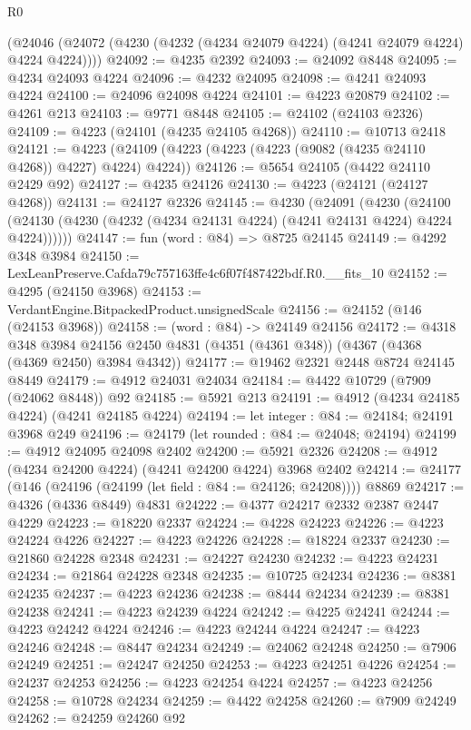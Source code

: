 \begin{lexlean}{R0}
\begin{coremodule}
    (@24046 (@24072 (@4230 (@4232 (@4234 @24079 @4224) (@4241 @24079 @4224) @4224 @4224))))
@24092 := @4235 @2392
@24093 := @24092 @8448
@24095 := @4234 @24093 @4224
@24096 := @4232 @24095
@24098 := @4241 @24093 @4224
@24100 := @24096 @24098 @4224
@24101 := @4223 @20879
@24102 := @4261 @213
@24103 := @9771 @8448
@24105 := @24102 (@24103 @2326)
@24109 := @4223 (@24101 (@4235 @24105 @4268))
@24110 := @10713 @2418
@24121 := @4223 (@24109 (@4223 (@4223 (@4223 (@9082 (@4235 @24110 @4268)) @4227) @4224) @4224))
@24126 := @5654 @24105 (@4422 @24110 @2429 @92)
@24127 := @4235 @24126
@24130 := @4223 (@24121 (@24127 @4268))
@24131 := @24127 @2326
@24145 := @4230
    (@24091
      (@4230
        (@24100 (@24130 (@4230 (@4232 (@4234 @24131 @4224) (@4241 @24131 @4224) @4224 @4224))))))
@24147 := fun (word : @84) => @8725 @24145
@24149 := @4292 @348 @3984
@24150 := LexLeanPreserve.Cafda79c757163ffe4c6f07f487422bdf.R0.__fits_10
@24152 := @4295 (@24150 @3968)
@24153 := VerdantEngine.BitpackedProduct.unsignedScale
@24156 := @24152 (@146 (@24153 @3968))
@24158 := (word : @84) -> @24149 @24156
@24172 := @4318
    @348
    @3984
    @24156
    @2450
    @4831
    (@4351 (@4361 @348))
    (@4367 (@4368 (@4369 @2450) @3984 @4342))
@24177 := @19462 @2321 @2448 @8724 @24145 @8449
@24179 := @4912 @24031 @24034
@24184 := @4422 @10729 (@7909 (@24062 @8448)) @92
@24185 := @5921 @213
@24191 := @4912 (@4234 @24185 @4224) (@4241 @24185 @4224)
@24194 := let integer : @84 := @24184; @24191 @3968 @249
@24196 := @24179 (let rounded : @84 := @24048; @24194)
@24199 := @4912 @24095 @24098 @2402
@24200 := @5921 @2326
@24208 := @4912 (@4234 @24200 @4224) (@4241 @24200 @4224) @3968 @2402
@24214 := @24177 (@146 (@24196 (@24199 (let field : @84 := @24126; @24208)))) @8869
@24217 := @4326 (@4336 @8449) @4831
@24222 := @4377 @24217 @2332 @2387 @2447 @4229
@24223 := @18220 @2337
@24224 := @4228 @24223
@24226 := @4223 @24224 @4226
@24227 := @4223 @24226
@24228 := @18224 @2337
@24230 := @21860 @24228 @2348
@24231 := @24227 @24230
@24232 := @4223 @24231
@24234 := @21864 @24228 @2348
@24235 := @10725 @24234
@24236 := @8381 @24235
@24237 := @4223 @24236
@24238 := @8444 @24234
@24239 := @8381 @24238
@24241 := @4223 @24239 @4224
@24242 := @4225 @24241
@24244 := @4223 @24242 @4224
@24246 := @4223 @24244 @4224
@24247 := @4223 @24246
@24248 := @8447 @24234
@24249 := @24062 @24248
@24250 := @7906 @24249
@24251 := @24247 @24250
@24253 := @4223 @24251 @4226
@24254 := @24237 @24253
@24256 := @4223 @24254 @4224
@24257 := @4223 @24256
@24258 := @10728 @24234
@24259 := @4422 @24258
@24260 := @7909 @24249
@24262 := @24259 @24260 @92

\end{coremodule}
\end{lexlean}
